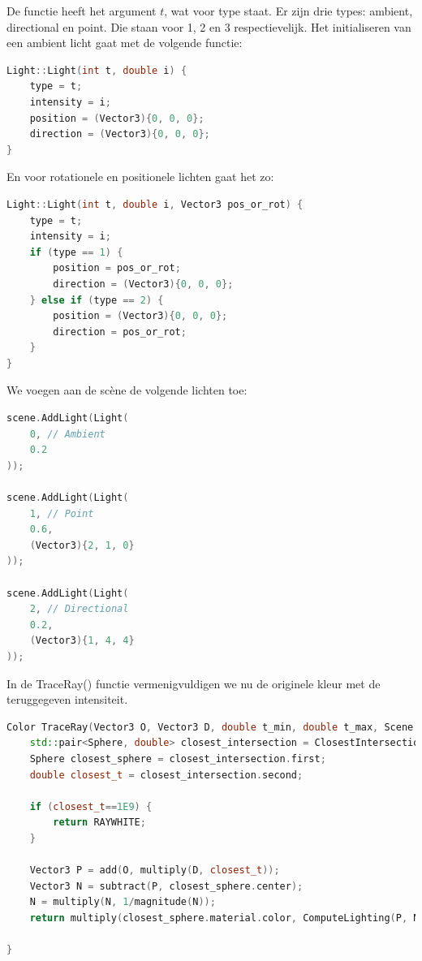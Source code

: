 \documentclass[12pt, a4paper]{article}
\begin{document}
De functie heeft het argument $t$, wat voor type staat. Er zijn drie types: ambient, directional en point. Die staan voor 1, 2 en 3 respectievelijk. Het initialiseren van een ambient licht gaat met de volgende functie:

\begin{lstlisting}[language=C++]
Light::Light(int t, double i) {
    type = t;
    intensity = i;
    position = (Vector3){0, 0, 0};
    direction = (Vector3){0, 0, 0};
}
\end{lstlisting}

En voor rotationele en positionele lichten gaat het zo:

\begin{lstlisting}[language=C++]
Light::Light(int t, double i, Vector3 pos_or_rot) {
    type = t;
    intensity = i;
    if (type == 1) {
        position = pos_or_rot;
        direction = (Vector3){0, 0, 0};
    } else if (type == 2) {
        position = (Vector3){0, 0, 0};
        direction = pos_or_rot;
    }
}
\end{lstlisting}

We voegen aan de scène de volgende lichten toe:

\begin{lstlisting}[language=C++]
scene.AddLight(Light(
    0, // Ambient
    0.2
));

scene.AddLight(Light(
    1, // Point
    0.6,
    (Vector3){2, 1, 0}
));

scene.AddLight(Light(
    2, // Directional
    0.2,
    (Vector3){1, 4, 4}
));
\end{lstlisting}

In de TraceRay() functie vermenigvuldigen we nu de originele kleur met de teruggegeven intensiteit. 

\begin{lstlisting}[language=C++]
Color TraceRay(Vector3 O, Vector3 D, double t_min, double t_max, Scene scene) {   
    std::pair<Sphere, double> closest_intersection = ClosestIntersection(O, D, t_min, t_max, scene);
    Sphere closest_sphere = closest_intersection.first;
    double closest_t = closest_intersection.second;

    if (closest_t==1E9) {
        return RAYWHITE;
    }

    Vector3 P = add(O, multiply(D, closest_t));
    Vector3 N = subtract(P, closest_sphere.center);
    N = multiply(N, 1/magnitude(N));
    return multiply(closest_sphere.material.color, ComputeLighting(P, N, multiply(D, -1), scene));

}
\end{lstlisting}
\end{document}

